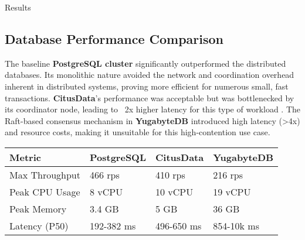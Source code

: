 \documentclass[a0,landscape]{config/poster/a0poster}
\newcommand{\postersection}[1]{%
  \begin{tcolorbox}[
    colback=IEEEblue,
    colframe=IEEEblue,
    fonttitle=\bfseries,
    coltext=white,
    sharp corners,
    boxrule=0pt,
    top=4pt,
    bottom=4pt,
    halign=center
  ]
    \large #1
  \end{tcolorbox}%
}
\begin{document}
\begin{multicols}{4}

    \postersection{Results}
    \subsection*{Database Performance Comparison}
    The baseline \textbf{PostgreSQL cluster} significantly outperformed the distributed databases. Its monolithic nature avoided the network and coordination overhead inherent in distributed systems, proving more efficient for numerous small, fast transactions. \textbf{CitusData}'s performance was acceptable but was bottlenecked by its coordinator node, leading to ~2x higher latency for this type of workload \cite{Slot2020}. The Raft-based consensus mechanism in \textbf{YugabyteDB} introduced high latency (\textgreater4x) and resource costs, making it unsuitable for this high-contention use case.

    \begin{center}\vspace{0.5cm}
        \begin{tabular}{l l l l}
            \toprule
            \textbf{Metric} & \textbf{PostgreSQL} & \textbf{CitusData} & \textbf{YugabyteDB} \\
            \midrule
            Max Throughput  & 466 rps             & 410 rps            & 216 rps             \\
            Peak CPU Usage  & 8 vCPU              & 10 vCPU            & 19 vCPU             \\
            Peak Memory     & 3.4 GB              & 5 GB               & 36 GB               \\
            Latency (P50)   & 192-382 ms          & 496-650 ms         & 854-10k ms          \\
            \bottomrule
        \end{tabular}
    \end{center}\vspace{0.5cm}


\end{multicols}
\end{document}
